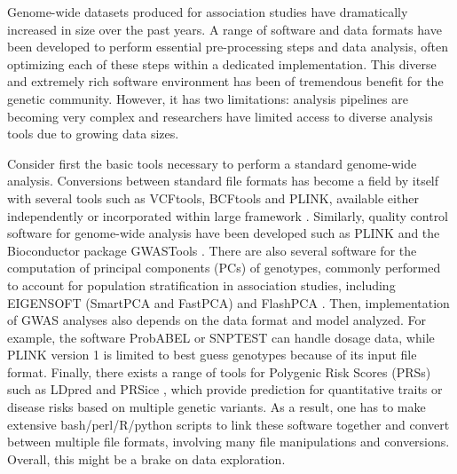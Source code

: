 \documentclass{bioinfo}
\begin{document}
Genome-wide datasets produced for association studies have dramatically increased in size over the past years. A range of software and data formats have been developed to perform essential pre-processing steps and data analysis, often optimizing each of these steps within a dedicated implementation. This diverse and extremely rich software environment has been of tremendous benefit for the genetic community. However, it has two limitations: analysis pipelines are becoming very complex and researchers have limited access to diverse analysis tools due to growing data sizes.

Consider first the basic tools necessary to perform a standard genome-wide analysis. Conversions between standard file formats has become a field by itself with several tools such as VCFtools, BCFtools and PLINK, available either independently or incorporated within large framework \cite[]{Danecek2011,Li2011,Purcell2007}. Similarly, quality control software for genome-wide analysis have been developed such as PLINK and the Bioconductor package GWASTools \cite[]{Gogarten2012}. 
There are also several software for the computation of principal components (PCs) of genotypes, commonly performed to account for population stratification in association studies, including EIGENSOFT (SmartPCA and FastPCA) and FlashPCA \cite[]{Abraham2014a,Abraham2016a,Galinsky2016,Price2006}. 
Then, implementation of GWAS analyses also depends on the data format and model analyzed. For example, the software ProbABEL \cite[]{Aulchenko2010} or SNPTEST \cite[]{Marchini2010} can handle dosage data, while PLINK version 1 is limited to best guess genotypes because of its input file format. 
Finally, there exists a range of tools for Polygenic Risk Scores (PRSs) such as LDpred \cite[]{Vilhjalmsson2015} and PRSice \cite[]{Euesden2015}, which provide prediction for quantitative traits or disease risks based on multiple genetic variants. As a result, one has to make extensive bash/perl/R/python scripts to link these software together and convert between multiple file formats, involving many file manipulations and conversions. Overall, this might be a brake on data exploration.
\end{document}
